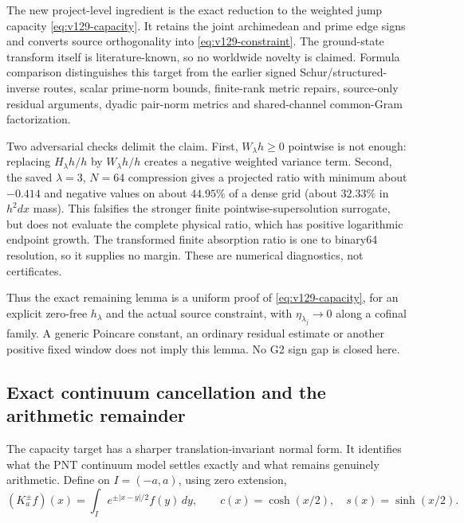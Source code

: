 \documentclass[11pt]{article}
\theoremstyle{remark}
\begin{document}
The new project-level ingredient is the exact reduction to the
weighted jump capacity \eqref{eq:v129-capacity}. It retains the joint
archimedean and prime edge signs and converts source orthogonality into
\eqref{eq:v129-constraint}. The ground-state transform itself is
literature-known, so no worldwide novelty is claimed. Formula
comparison distinguishes this target from the earlier signed
Schur/structured-inverse routes, scalar prime-norm bounds, finite-rank
metric repairs, source-only residual arguments, dyadic pair-norm
metrics and shared-channel common-Gram factorization.

Two adversarial checks delimit the claim. First, $W_\lambda h\ge0$
pointwise is not enough: replacing $H_\lambda h/h$ by
$W_\lambda h/h$ creates a negative weighted variance term. Second,
the saved $\lambda=3$, $N=64$ compression gives a projected ratio with
minimum about $-0.414$ and negative values on about $44.95\%$ of a
dense grid (about $32.33\%$ in $h^2dx$ mass). This falsifies the
stronger finite pointwise-supersolution surrogate, but does not
evaluate the complete physical ratio, which has positive logarithmic
endpoint growth. The transformed finite absorption ratio is one to
binary64 resolution, so it supplies no margin. These are numerical
diagnostics, not certificates.

Thus the exact remaining lemma is a uniform proof of
\eqref{eq:v129-capacity}, for an explicit zero-free $h_\lambda$ and the
actual source constraint, with $\eta_{\lambda_j}\to0$ along a cofinal
family. A generic Poincare constant, an ordinary residual estimate or
another positive fixed window does not imply this lemma. No G2 sign
gap is closed here.

\subsection*{Exact continuum cancellation and the arithmetic remainder}

The capacity target has a sharper translation-invariant normal form.
It identifies what the PNT continuum model settles exactly and what
remains genuinely arithmetic. Define on $I=(-a,a)$, using zero
extension,
\[
 (K_a^\pm f)(x)=\int_I e^{\pm|x-y|/2}f(y)\,dy,\qquad
 c(x)=\cosh(x/2),\quad s(x)=\sinh(x/2).
\]
\end{document}
